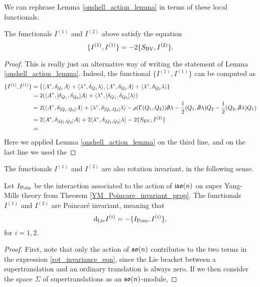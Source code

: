 \documentclass[10pt, oneside]{article}
\begin{document}
We can rephrase Lemma \ref{onshell_action_lemma} in terms of these local functionals.
\begin{lemma} \label{onshell_interaction_lemma}
The functionals $I^{(1)}$ and $I^{(2)}$ above satisfy the equation
\[\{I^{(1)},I^{(1)}\} = -2\{S_{\mathrm{BV}} , I^{(2)}\}.\]
\end{lemma}

\begin{proof}
This is really just an alternative way of writing the statement of Lemma \ref{onshell_action_lemma}.  Indeed, the functional $\{I^{(1)},I^{(1)}\}$ can be computed as 
\begin{align*}
\{I^{(1)},I^{(1)}\} &= \{\<A^* , \delta_{Q_1} A\> + \<\lambda^*, \delta_{Q_1} \lambda\>, \<A^* , \delta_{Q_2} A\> + \<\lambda^*, \delta_{Q_2} \lambda\> \} \\
&= 2(\langle A^*, [\delta_{Q_1}, \delta_{Q_2}] A \rangle + \langle \lambda^*, [\delta_{Q_1}, \delta_{Q_2}] \lambda \rangle) \\
 &= 2(\langle A^*, \delta_{[Q_1,Q_2]} A \rangle + \langle \lambda^*, \delta_{[Q_1,Q_2]} \lambda \rangle  - \rho(\Gamma(Q_1,Q_2)) \sd \dd \lambda - \frac 12(Q_1, \sd \dd \lambda)Q_2 - \frac 12(Q_2, \sd \dd \lambda)Q_1) \\
 &= 2\langle A^*, \delta_{[Q_1,Q_2]} A \rangle + 2\langle \lambda^*, \delta_{[Q_1,Q_2]} \lambda \rangle - 2\{S_{\mr{BV}} , I^{(2)}\} \\
 &=
\end{align*}
Here we applied Lemma \ref{onshell_action_lemma} on the third line, and on the last line we used the 
\end{proof}

The functionals $I^{(1)}$ and $I^{(2)}$ are also rotation invariant, in the following sense.
\begin{lemma} \label{SUSY_rotation_invariance_lemma}
Let $I_{\mathrm{Poin}}$ be the interaction associated to the action of $\mathfrak{iso}(n)$ on super Yang-Mills theory from Theorem \ref{YM_Poincare_invariant_prop}.  The functionals $I^{(1)}$ and $I^{(2)}$ are Poincar\'e invariant, meaning that
\begin{equation}\label{rot_invariance_eqn}
 {\rm d}_{\mathrm{Lie}} I^{(i)} = - \{I_{\mathrm{Poin}}, I^{(i)}\},
\end{equation}
for $i=1,2$.
\end{lemma}

\begin{proof}
First, note that only the action of $\mathfrak{so}(n)$ contributes to the two terms in the expression \ref{rot_invariance_eqn}, since the Lie bracket between a supertranslation and an ordinary translation is always zero.  If we then consider the space $\Sigma$ of supertranslations as an $\mathfrak{so}(n)$-module, 
\end{proof}
\end{document}
